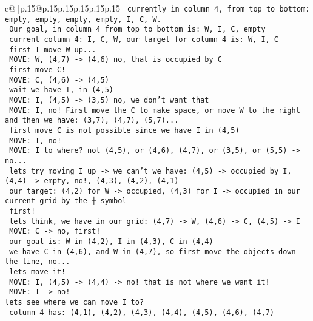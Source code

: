 \documentclass{article}
\begin{document}
{\begin{supertabular}{c@{$\;$}|p{.15\linewidth}@{}p{.15\linewidth}p{.15\linewidth}p{.15\linewidth}p{.15\linewidth}p{.15\linewidth}}
{{{\texttt{ currently in column 4, from top to bottom: empty, empty, empty, empty, I, C, W.} \\
\texttt{ Our goal, in column 4 from top to bottom is: W, I, C, empty} \\
\texttt{ current column 4: I, C, W, our target for column 4 is: W, I, C} \\
\texttt{ first I move W up...} \\
\texttt{ MOVE: W, (4,7) {-}> (4,6) no, that is occupied by C} \\
\texttt{ first move C!} \\
\texttt{ MOVE: C, (4,6) {-}> (4,5) } \\
\texttt{ wait we have I, in (4,5)} \\
\texttt{ MOVE: I, (4,5) {-}> (3,5) no, we don't want that} \\
\texttt{ MOVE: I, no! First move the C to make space, or move W to the right and then we have: (3,7), (4,7), (5,7)...} \\
\texttt{ first move C is not possible since we have I in (4,5) } \\
\texttt{ MOVE: I, no! } \\
\texttt{ MOVE: I to where? not (4,5), or (4,6), (4,7), or (3,5), or (5,5) {-}> no...} \\
\texttt{ lets try moving I up {-}> we can't we have: (4,5) {-}> occupied by I, (4,4) {-}> empty, no!, (4,3), (4,2), (4,1) } \\
\texttt{ our target: (4,2) for W {-}> occupied, (4,3) for I {-}> occupied in our current grid by the ┼ symbol} \\
\texttt{ first!} \\
\texttt{ lets think, we have in our grid: (4,7) {-}> W, (4,6) {-}> C, (4,5) {-}> I } \\
\texttt{ MOVE: C {-}> no, first!} \\
\texttt{ our goal is: W in (4,2), I in (4,3), C in (4,4)} \\
\texttt{ we have C in (4,6), and W in (4,7), so first move the objects down the line, no...} \\
\texttt{ lets move it!} \\
\texttt{ MOVE: I, (4,5) {-}> (4,4) {-}> no! that is not where we want it!} \\
\texttt{ MOVE: I {-}> no! } \\
\texttt{lets see where we can move I to? } \\
\texttt{ column 4 has: (4,1), (4,2), (4,3), (4,4), (4,5), (4,6), (4,7) } \\
}}}
\end{supertabular}}
\end{document}
